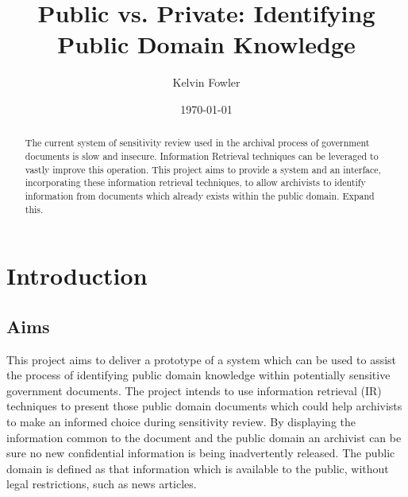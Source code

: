 \documentclass{l4proj}
\title{Public vs. Private: \newline Identifying Public Domain Knowledge}
\author{Kelvin Fowler}
\date{\today}
\begin{document}
\maketitle

\begin{abstract}
The current system of sensitivity review used in the archival process of government documents is slow and insecure. Information Retrieval techniques can be leveraged to vastly improve this operation. This project aims to provide a system and an interface, incorporating these information retrieval techniques, to allow archivists to identify information from documents which already exists within the public domain.
Expand this.
\end{abstract}


\educationalconsent
\tableofcontents
\listoftodos

\chapter{Introduction}

\section{Aims}
This project aims to deliver a prototype of a system which can be used to assist the process of identifying public domain knowledge within potentially sensitive government documents. The project intends to use information retrieval (IR) techniques to present those public domain documents which could help archivists to make an informed choice during sensitivity review. By displaying the information common to the document and the public domain an archivist can be sure no new confidential information is being inadvertently released.
The public domain is defined as that information which is available to the public, without legal restrictions, such as news articles.
\end{document}
